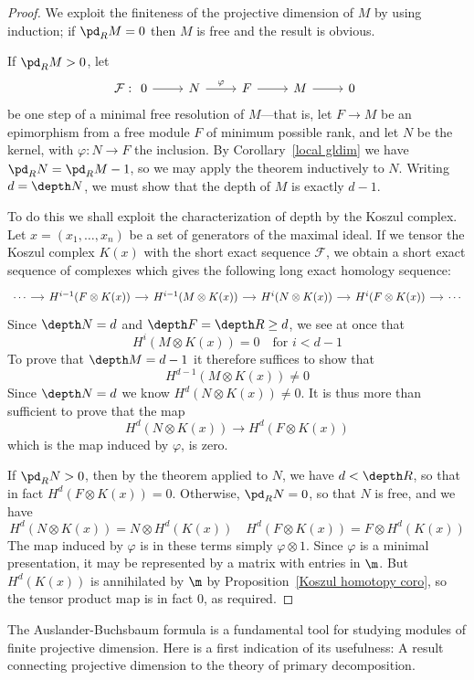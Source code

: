\begin{proof}
We exploit the finiteness of the projective dimension of $M$ by using induction; if $\pd_RM=0$ then $M$ is free and the result is obvious.\par
If $\pd_RM>0$, let
\[\mathcal{F}:\begin{tikzcd}
0\ar[r]&N\ar[r,"\varphi"]&F\ar[r]&M\ar[r]&0
\end{tikzcd}\]
be one step of a minimal free resolution of $M$---that is, let $F\to M$ be an epimorphism from a free module $F$ of minimum possible rank, and let $N$
be the kernel, with $\varphi:N\to F$ the inclusion. By Corollary~\ref{local gldim} we have $\pd_RN=\pd_RM-1$, so we may apply the theorem inductively to $N$. Writing $d=\depth N$, we must show that the depth of $M$ is exactly $d-1$.\par
To do this we shall exploit the characterization of depth by the Koszul
complex. Let $x=(x_1,\dots,x_n)$ be a set of generators of the maximal ideal. If we tensor the Koszul complex $K(x)$ with the short exact sequence $\mathcal{F}$, we obtain a short exact sequence of complexes which gives the following long exact homology sequence:
\[\begin{tikzcd}[column sep=small]
\cdots\ar[r]&H^{i-1}(F\otimes K(x))\ar[r]&H^{i-1}(M\otimes K(x))\ar[r]&H^{i}(N\otimes K(x))\ar[r]&H^{i}(F\otimes K(x))\ar[r]&\cdots
\end{tikzcd}\]
Since $\depth N=d$ and $\depth F=\depth R\geq d$, we see at once that
\[H^i(M\otimes K(x))=0\quad\text{for }i<d-1\]
To prove that $\depth M=d-1$ it therefore suffices to show that
\[H^{d-1}(M\otimes K(x))\neq 0\]
Since $\depth N=d$ we know $H^d(N\otimes K(x))\neq 0$. It is thus more than
sufficient to prove that the map
\[H^d(N\otimes K(x))\to H^d(F\otimes K(x))\]
which is the map induced by $\varphi$, is zero.\par
If $\pd_RN>0$, then by the theorem applied to $N$, we have $d<\depth R$, so that in fact $H^d(F\otimes K(x))=0$. Otherwise, $\pd_RN=0$, so that $N$ is free, and we have
\[H^d(N\otimes K(x))=N\otimes H^d(K(x))\quad H^d(F\otimes K(x))=F\otimes H^d(K(x))\]
The map induced by $\varphi$ is in these terms simply $\varphi\otimes 1$. Since $\varphi$ is a minimal presentation, it may be represented by a matrix with entries in $\m$. But $H^d(K(x))$ is annihilated by $\m$ by Proposition~\ref{Koszul homotopy coro}, so the tensor product map is in fact $0$, as required.
\end{proof}
The Auslander-Buchsbaum formula is a fundamental tool for studying modules of finite projective dimension. Here is a first indication of its usefulness: A result connecting projective dimension to the theory of primary decomposition.
